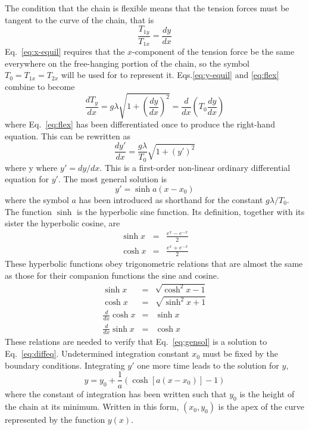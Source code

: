 \documentclass{revtex4}
\begin{document}
The condition that the chain is flexible means that the tension forces must
be tangent to the curve of the chain, that is
\begin{equation}
\frac{T_{1y}}{T_{1x}} = \frac{dy}{dx}
\label{eq:flex}
\end{equation}
Eq.~\ref{eq:x-equil} requires that the $x$-component of the tension force be
the same everywhere on the free-hanging portion of the chain, so the symbol
$T_0 = T_{1x} = T_{2x}$ will be used for to represent it. Eqs.\ref{eq:y-equil}
and \ref{eq:flex} combine to become
\begin{equation}
\frac{dT_y}{dx} = g\lambda\sqrt{1+\left(\frac{dy}{dx}\right)^2}
= \frac{d}{dx}\left(T_0 \frac{dy}{dx}\right)
\end{equation}
where Eq.~\ref{eq:flex} has been differentiated once to produce the
right-hand equation. This can be rewritten as
\begin{equation}
\frac{dy'}{dx} = \frac{g\lambda}{T_0}\sqrt{1+(y')^2}
\label{eq:diffeq}
\end{equation}
where y
where $y' = dy/dx$. This is a first-order non-linear ordinary differential
equation for $y'$.  The most general solution is
\begin{equation}
y' = \sinh{a(x-x_0)}
\label{eq:gensol}
\end{equation}
where the symbol $a$ has been introduced as shorthand for the constant
$g\lambda/T_0$. The function $\sinh$ is the hyperbolic sine function.
Its definition, together with its sister the hyperbolic cosine, are
\begin{eqnarray}
\sinh{x} &=& \frac{e^x - e^{-x}}{2} \nonumber \\
\cosh{x} &=& \frac{e^x + e^{-x}}{2} \nonumber
\end{eqnarray}
These hyperbolic functions obey trigonometric relations that are almost
the same as those for their companion functions the sine and cosine.
\begin{eqnarray}
\sinh{x} &=& \sqrt{\cosh^2{x}-1} \nonumber \\
\cosh{x} &=& \sqrt{\sinh^2{x}+1} \nonumber \\
\frac{d}{dx}\cosh{x} &=& \sinh{x} \nonumber \\
\frac{d}{dx}\sinh{x} &=& \cosh{x} \nonumber
\end{eqnarray}
These relations are needed to verify that Eq.~\ref{eq:gensol} is a solution
to Eq.~\ref{eq:diffeq}.  Undetermined integration constant $x_0$ must be
fixed by the boundary conditions. Integrating $y'$ one more time leads to
the solution for $y$,
\begin{equation}
y = y_0 + \frac{1}{a}\left(\cosh[a(x-x_0)] - 1\right)
\label{eq:solfory}
\end{equation}
where the constant of integration has been written such that $y_0$ is the
height of the chain at its minimum. Written in this form, $(x_0,y_0)$ is the
apex of the curve represented by the function $y(x)$. 
\end{document}

